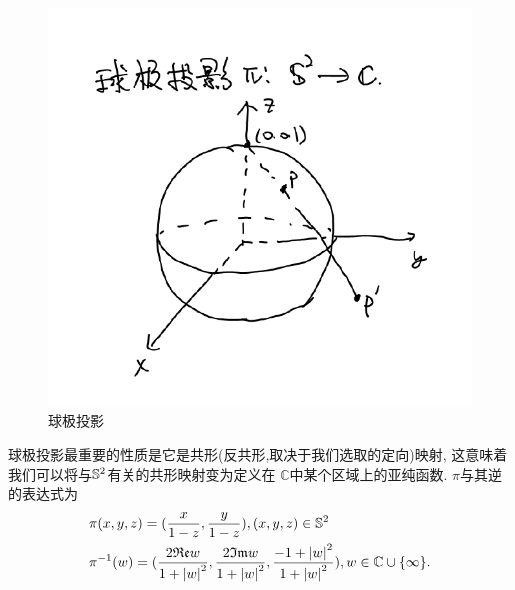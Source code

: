 \begin{figure}[ht]
	\centering
	\includegraphics[scale=0.5]{images/stereo.png}
	\caption{球极投影}
	\label{stereopng}
\end{figure}
球极投影最重要的性质是它是共形(反共形,取决于我们选取的定向)映射, 这意味着我们可以将与$\S^2$有关的共形映射变为定义在 $\mathbb{C}$中某个区域上的亚纯函数. $\pi$与其逆的表达式为
\begin{align}
    &\pi(x,y,z)=(\frac{x}{1-z}, \frac{y}{1-z}), (x,y,z) \in \S^2\\
    &\pi^{-1}(w)= (\frac{2\Re w}{1+\abs{w}^2}, \frac{2\Im w}{1+\abs{w}^2}, \frac{-1+\abs{w}^2}{1+\abs{w}^2}), w \in \mathbb{C} \cup \{\infty\}.
\end{align}
